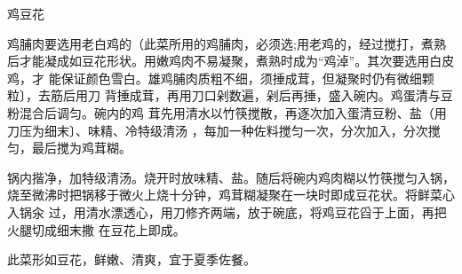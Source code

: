 \begin{recipe}{鸡豆花\protect\footnotemark}

\ingredients


\cooking

\step 鸡脯肉要选用老白鸡的（此菜所用的鸡脯肉，必须选;用老鸡的，经过搅打，煮熟
后才能凝成如豆花形状。用嫩鸡肉不易凝聚，煮熟时成为“鸡淖”。其次要选用白皮鸡，才
能保证颜色雪白。雄鸡脯肉质粗不细，须捶成茸，但凝聚时仍有微细颗粒〕，去筋后用刀
背捶成茸，再用刀口剁数遍，剁后再捶，盛入碗内。鸡蛋清与豆粉混合后调匀。碗内的鸡
茸先用清水以竹筷搅散，再逐次加入蛋清豆粉、盐（用刀压为细末〕、味精、冷特级清汤
，每加一种佐料搅匀一次，分次加入，分次搅匀，最后搅为鸡茸糊。

\step 锅内揩净，加特级清汤。烧开时放味精、盐。随后将碗内鸡肉糊以竹筷搅匀入锅，
烧至微沸时把锅移于微火上烧十分钟，鸡茸糊凝聚在一块时即成豆花状。将鲜菜心入锅汆
过，用清水漂透心，用刀修齐两端，放于碗底，将鸡豆花舀于上面，再把火腿切成细末撒
在豆花上即成。

\features

此菜形如豆花，鲜嫩、清爽，宜于夏季佐餐。


\end{recipe}

